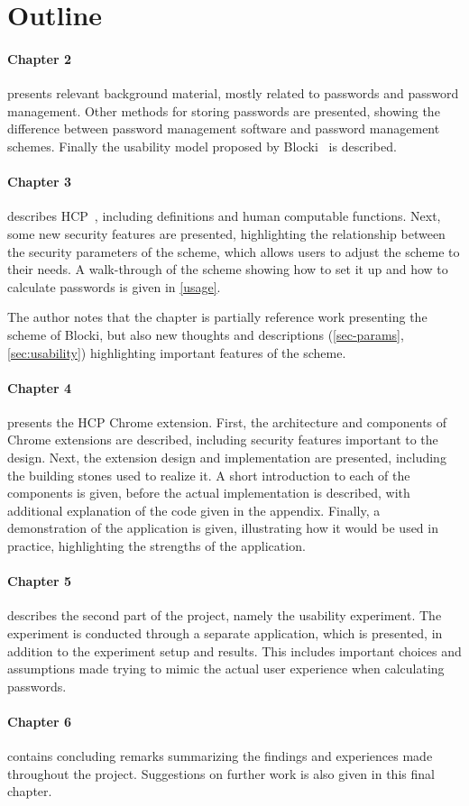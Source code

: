 \section{Outline}
\paragraph{Chapter 2} presents relevant background material, mostly related to passwords and password management. Other methods for storing passwords are presented, showing the difference between password management software and password management schemes. Finally the usability model proposed by Blocki~\cite{Blocki2014} is described.
\paragraph{Chapter 3} describes HCP~\cite{hcp-blocki}, including definitions and human computable functions. Next, some new security features are presented, highlighting the relationship between the security parameters of the scheme, which allows users to adjust the scheme to their needs. A walk-through of the scheme showing how to set it up and how to calculate passwords is given in \autoref{usage}.
\par The author notes that the chapter is partially reference work presenting the scheme of Blocki, but also new thoughts and descriptions (\autoref{sec-params}, \autoref{sec:usability}) highlighting important features of the scheme. 
\paragraph{Chapter 4} presents the HCP Chrome extension. First, the architecture and components of Chrome extensions are described, including security features important to the design. Next, the extension design and implementation are presented, including the building stones used to realize it. A short introduction to each of the components is given, before the actual implementation is described, with additional explanation of the code given in the appendix. Finally, a demonstration of the application is given, illustrating how it would be used in practice, highlighting the strengths of the application.
\paragraph{Chapter 5} describes the second part of the project, namely the usability experiment. The experiment is conducted through a separate application, which is presented, in addition to the experiment setup and results. This includes important choices and assumptions made trying to mimic the actual user experience when calculating passwords.
\paragraph{Chapter 6} contains concluding remarks summarizing the findings and experiences made throughout the project. Suggestions on further work is also given in this final chapter.


